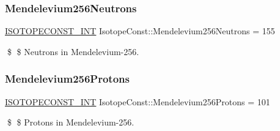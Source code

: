 \subsubsection{\texorpdfstring{Mendelevium256\+Neutrons}{Mendelevium256Neutrons}}
{\footnotesize\ttfamily \mbox{\hyperlink{group___isotope_const-_macros_ga5f18360b3e99483a35c32d789e62621c}{I\+S\+O\+T\+O\+P\+E\+C\+O\+N\+S\+T\+\_\+\+I\+NT}} Isotope\+Const\+::\+Mendelevium256\+Neutrons = 155}

\$ \$ Neutrons in Mendelevium-\/256. \mbox{\label{group___isotope_const-_mendelevium-_md256_ga36b88bfbc6a3c7af16d5ff7aaa9b82fc}} 
\subsubsection{\texorpdfstring{Mendelevium256\+Protons}{Mendelevium256Protons}}
{\footnotesize\ttfamily \mbox{\hyperlink{group___isotope_const-_macros_ga5f18360b3e99483a35c32d789e62621c}{I\+S\+O\+T\+O\+P\+E\+C\+O\+N\+S\+T\+\_\+\+I\+NT}} Isotope\+Const\+::\+Mendelevium256\+Protons = 101}

\$ \$ Protons in Mendelevium-\/256. 